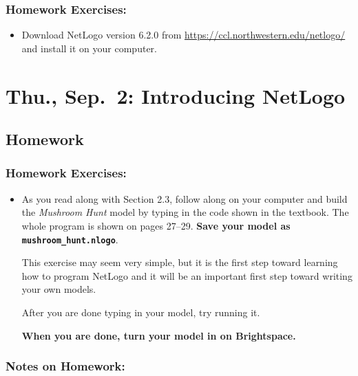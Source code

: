 \documentclass[
]{article}
\providecommand{\tightlist}{%
  \setlength{\itemsep}{0pt}\setlength{\parskip}{0pt}}
\begin{document}
\hypertarget{homework-exercises}{%
\subsubsection{Homework Exercises:}\label{homework-exercises}}

\begin{itemize}
\tightlist
\item
  Download NetLogo version 6.2.0 from
  \url{https://ccl.northwestern.edu/netlogo/} and install it on your
  computer.
\end{itemize}

\hypertarget{thu.-sep.-2-introducing-netlogo}{%
\section{Thu., Sep.~2: Introducing
NetLogo}\label{thu.-sep.-2-introducing-netlogo}}

\hypertarget{homework-1}{%
\subsection{Homework}\label{homework-1}}

\hypertarget{homework-exercises-1}{%
\subsubsection{Homework Exercises:}\label{homework-exercises-1}}

\begin{itemize}
\item
  As you read along with Section 2.3, follow along on your computer and
  build the \emph{Mushroom Hunt} model by typing in the code shown in
  the textbook. The whole program is shown on pages 27--29. \textbf{Save
  your model as \texttt{mushroom\_hunt.nlogo}}.

  This exercise may seem very simple, but it is the first step toward
  learning how to program NetLogo and it will be an important first step
  toward writing your own models.

  After you are done typing in your model, try running it.

  \textbf{When you are done, turn your model in on Brightspace.}
\end{itemize}

\hypertarget{notes-on-homework}{%
\subsubsection{Notes on Homework:}\label{notes-on-homework}}
\end{document}
